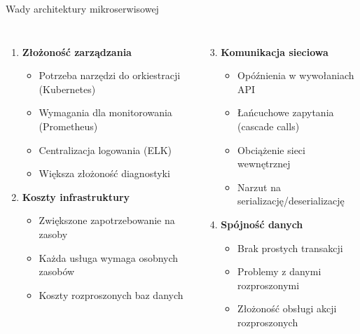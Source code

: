 \documentclass[aspectratio=169,xcolor=table]{beamer}
\begin{document}
\begin{frame}{Wady architektury mikroserwisowej}
  \begin{columns}
    \begin{enumerate}
      \item \textbf{Złożoność zarządzania}
        \begin{itemize}
          \item Potrzeba narzędzi do orkiestracji (Kubernetes)
          \item Wymagania dla monitorowania (Prometheus)
          \item Centralizacja logowania (ELK)
          \item Większa złożoność diagnostyki
        \end{itemize}
      
      \item \textbf{Koszty infrastruktury}
        \begin{itemize}
          \item Zwiększone zapotrzebowanie na zasoby
          \item Każda usługa wymaga osobnych zasobów
          \item Koszty rozproszonych baz danych
        \end{itemize}
    \end{enumerate}
    
    \begin{enumerate}\setcounter{enumi}{2}
      \item \textbf{Komunikacja sieciowa}
        \begin{itemize}
          \item Opóźnienia w wywołaniach API
          \item Łańcuchowe zapytania (cascade calls)
          \item Obciążenie sieci wewnętrznej
          \item Narzut na serializację/deserializację
        \end{itemize}
        
      \item \textbf{Spójność danych}
        \begin{itemize}
          \item Brak prostych transakcji
          \item Problemy z danymi rozproszonymi
          \item Złożoność obsługi akcji rozproszonych
        \end{itemize}
    \end{enumerate}
  \end{columns}
\end{frame}
\end{document}
